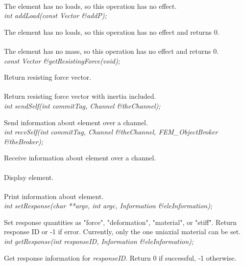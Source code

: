  \\	
The element has no loads, so this operation has no effect.
\\

{\em    int addLoad(const Vector \&addP);} 

The element has no loads, so this operation has no effect and returns 0.
\\

 \\    
The element has no mass, so this operation has no effect and returns 0.
\\

{\em    const Vector \&getResistingForce(void);} 

Return resisting force vector.
\\

 \\            
Return resisting force vector with inertia included.
\\

{\em    int sendSelf(int commitTag, Channel \&theChannel);} 

Send information about element over a channel.
\\

{\em    int recvSelf(int commitTag, Channel \&theChannel, FEM\_ObjectBroker \&theBroker);} 

Receive information about element over a channel.
\\

 \\    
Display element.
\\

 \\    
Print information about element.
\\

{\em    int setResponse(char **argv, int argc, Information \&eleInformation);} 

Set response quantities as "force", "deformation", "material", or "stiff".  Return response
ID  or -1 if error.  Currently, only the one uniaxial material can be set.
\\

{\em    int getResponse(int responseID, Information \&eleInformation);} 

Get response information for {\em responseID}.  Return 0 if successful, -1 otherwise.
\\






